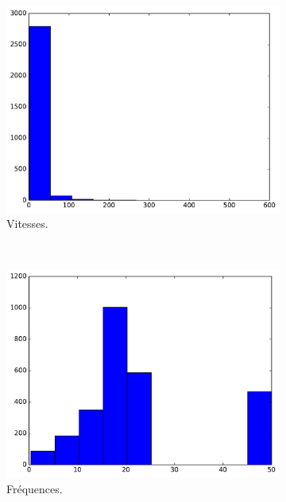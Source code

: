 \begin{appendices}
	\begin{figure}[htbp]	
		\begin{subfigure}[t]{\subImgWclicks}
			\centering
			\includegraphics[width=\textwidth]{figures/ch3/bille_filteredSpeed}
			\caption{Vitesses.}
			\label{fig:bille_filteredSpeed}
		\end{subfigure}
		~
		\begin{subfigure}[t]{\subImgWclicks}
			\centering
			\includegraphics[width=\textwidth]{figures/ch3/bille_frequency}
			\caption{Fréquences.}
			\label{fig:bille_frequency}
		\end{subfigure}
		~
		\begin{subfigure}[t]{\subImgWclicks}
			\centering

\end{subfigure}
\end{figure}
\end{appendices}
